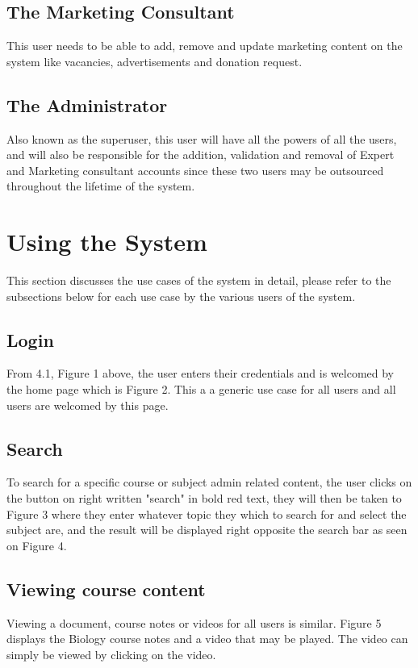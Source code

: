 \documentclass[12pt,a4paper]{article}
\begin{document}
		\subsection{The Marketing Consultant}
		 This user needs to be able to add, remove and update marketing content on the system like vacancies, advertisements and donation request.
		 
		 
		 \subsection{The Administrator}
		 Also known as the superuser, this user will have all the powers of all the users, and will also be responsible for the addition, validation and removal of Expert and Marketing consultant accounts since these two users may be outsourced throughout the lifetime of the system.
		 
	\section{Using the System}
	 This section discusses the use cases of the system in detail, please refer to the subsections below for each use case by the various users of the system.
	 	\subsection{Login}
	 	 From 4.1, Figure 1 above, the user enters their credentials and  is welcomed by the home page which is Figure 2. This a a generic use case for all users and all users are welcomed by this page.
	 	 
	 	 \subsection{Search}
	 	 To search for a specific course or subject admin related content, the user clicks on the button on right written "search" in bold red text, they will then be taken to Figure 3 where they enter whatever topic they which to search for and select the subject are, and the result will be displayed right opposite the search bar as seen on Figure 4.
	 	 
	 	 
	 	 
	 	 \subsection{Viewing course content}
		Viewing a document, course notes or videos for all users is similar. Figure 5 displays the Biology course notes and a video that may be played. The video can simply be viewed by clicking on the video.
		
\end{document}

